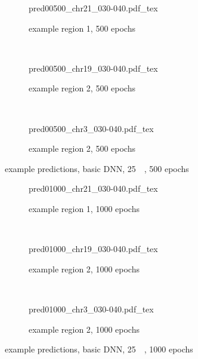 \begin{figure}[p]
    \begin{subfigure}{\textwidth}
        \centering
        \scriptsize
        {pred00500_chr21_030-040.pdf_tex}
        \caption{example  region 1, 500 epochs} \label{fig:results:basic_r1}
    \end{subfigure}\\[6mm]
    \begin{subfigure}{\textwidth}
        \centering
        \scriptsize
        {pred00500_chr19_030-040.pdf_tex}
        \caption{example region 2, 500 epochs} \label{fig:results:basic_r2}
    \end{subfigure}\\[6mm]
    \begin{subfigure}{\textwidth}
        \centering
        \scriptsize
        {pred00500_chr3_030-040.pdf_tex}
        \caption{example region 2, 500 epochs} \label{fig:results:basic_r3}
    \end{subfigure}
    \caption{example predictions, basic DNN, \SI{25}{\kilo\bp}, 500 epochs} \label{fig:results:basic500}
\end{figure}
\begin{figure}[p]
    \begin{subfigure}{\textwidth}
        \centering
        \scriptsize
        {pred01000_chr21_030-040.pdf_tex}
        \caption{example  region 1, 1000 epochs} \label{fig:results:basic_r1_1000}
    \end{subfigure}\\[6mm]
    \begin{subfigure}{\textwidth}
        \centering
        \scriptsize
        {pred01000_chr19_030-040.pdf_tex}
        \caption{example region 2, 1000 epochs} \label{fig:results:basic_r2_1000}
    \end{subfigure}\\[6mm]
    \begin{subfigure}{\textwidth}
        \centering
        \scriptsize
        {pred01000_chr3_030-040.pdf_tex}
        \caption{example region 2, 1000 epochs} \label{fig:results:basic_r3_1000}
    \end{subfigure}
    \caption{example predictions, basic DNN, \SI{25}{\kilo\bp}, 1000 epochs} \label{fig:results:basic1000}
\end{figure}
